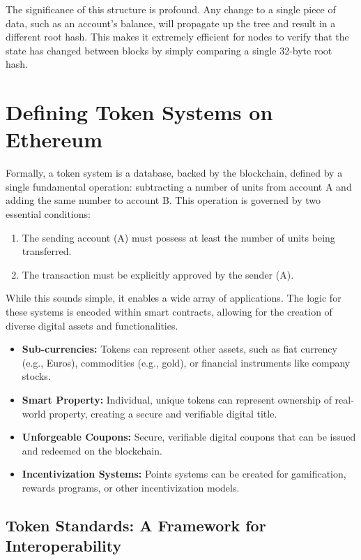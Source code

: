 \documentclass{scrbook}
\begin{document}
The significance of this structure is profound. Any change to a single piece of data, such as an account's balance, will propagate up the tree and result in a different root hash. This makes it extremely efficient for nodes to verify that the state has changed between blocks by simply comparing a single 32-byte root hash.

\chapter{Defining Token Systems on Ethereum}

Formally, a token system is a database, backed by the blockchain, defined by a single fundamental operation: subtracting a number of units from account A and adding the same number to account B. This operation is governed by two essential conditions:

\begin{enumerate}
    \item The sending account (A) must possess at least the number of units being transferred.
    \item The transaction must be explicitly approved by the sender (A).
\end{enumerate}

While this sounds simple, it enables a wide array of applications. The logic for these systems is encoded within smart contracts, allowing for the creation of diverse digital assets and functionalities.

\begin{itemize}
    \item \textbf{Sub-currencies:} Tokens can represent other assets, such as fiat currency (e.g., Euros), commodities (e.g., gold), or financial instruments like company stocks.
    \item \textbf{Smart Property:} Individual, unique tokens can represent ownership of real-world property, creating a secure and verifiable digital title.
    \item \textbf{Unforgeable Coupons:} Secure, verifiable digital coupons that can be issued and redeemed on the blockchain.
    \item \textbf{Incentivization Systems:} Points systems can be created for gamification, rewards programs, or other incentivization models.
\end{itemize}

\section{Token Standards: A Framework for Interoperability}
\end{document}
